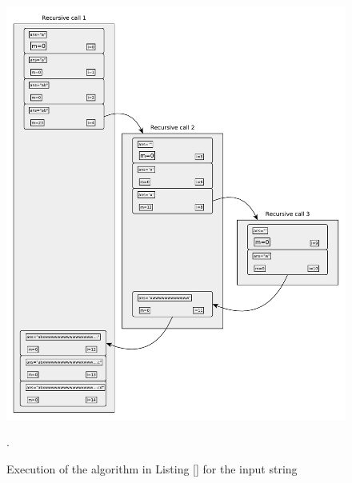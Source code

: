 


\begin{figure}
	\centering
	\includegraphics[width=\textwidth]{sources/decode_string/images/recursion}
   \caption{Execution of the algorithm in Listing \ref{} for the input string }. \label{fig:decode_string:recursion}
 \end{figure}




